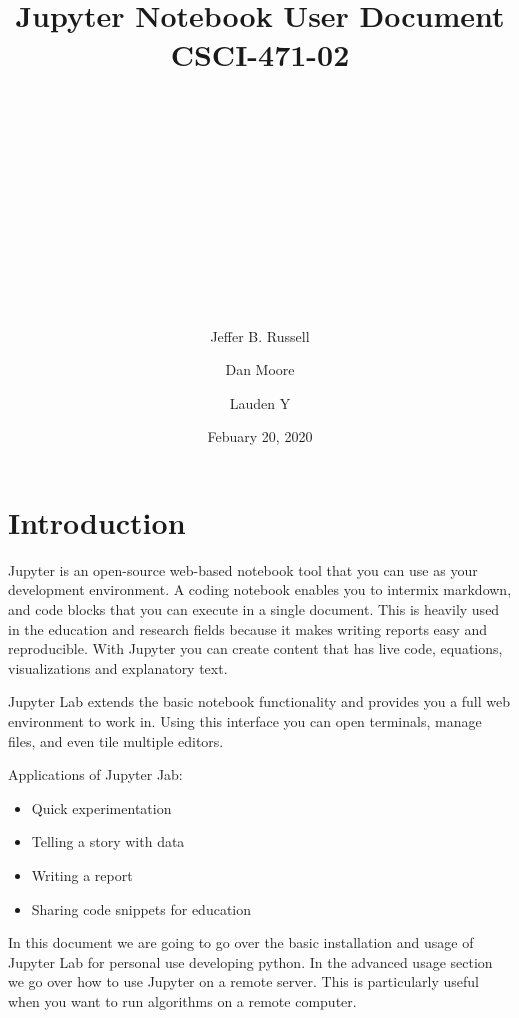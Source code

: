 \documentclass[pdftex,12pt]{artikel3}
\title{
\begin{center}
\huge{Jupyter Notebook User Document} \\
\huge{CSCI-471-02}\\
\end{center}
\\
\\
\\
\\
\\
\author{} %
\date{}   %
}
\begin{document}
\maketitle


\begin{center}
\author{Jeffer B. Russell}
\author{Dan Moore}
\author{Lauden Y}

\date{Febuary 20, 2020}
\end{center}

\newpage

\tableofcontents
{}
\newpage
\listoffigures
{}

\newpage

\section{Introduction}

Jupyter  is an open-source web-based notebook tool that you can use as your development environment.
A coding notebook enables you to intermix markdown, and code blocks that you can execute in a single document. This is heavily used in the education and research fields because it makes writing reports easy and reproducible. With Jupyter you can create content that has live code, equations, visualizations and explanatory text.

Jupyter Lab extends the basic notebook functionality and provides you a full web environment to work in. Using this interface you can open terminals, manage files, and even tile multiple editors.

Applications of Jupyter Jab:

\begin{itemize}
  \item Quick experimentation
  \item Telling a story with data
  \item Writing a report
  \item Sharing code snippets for education
\end{itemize}

In this document we are going to go over the basic installation and usage of Jupyter Lab for personal use developing python. In the advanced usage section we go over how to use Jupyter on a remote server. This is particularly useful when you want to run algorithms on a remote computer.
\end{document}
